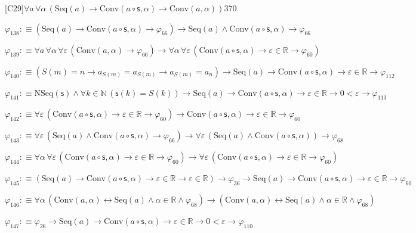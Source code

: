 \begin{fullproof}{[C29]}{$\forall a\,\forall \alpha\,(\mathrm{Seq}(a) \to \mathrm{Conv}(a \circ \mathsf{s},\alpha) \to \mathrm{Conv}(a,\alpha))$}{370}
\begin{abbrevlist}
\item $\varphi_{138} :\equiv (\mathrm{Seq}(a) \to \mathrm{Conv}(a \circ \mathsf{s},\alpha) \to \varphi_{66}) \to \mathrm{Seq}(a) \land \mathrm{Conv}(a \circ \mathsf{s},\alpha) \to \varphi_{66}$
\item $\varphi_{139} :\equiv \forall a\,\forall \alpha\,\forall \varepsilon\,(\mathrm{Conv}(a,\alpha) \to \varphi_{66}) \to \forall \alpha\,\forall \varepsilon\,(\mathrm{Conv}(a \circ \mathsf{s},\alpha) \to \varepsilon \in \mathbb{R} \to \varphi_{60})$
\item $\varphi_{140} :\equiv (S(m) = n \to a_{S(m)} = a_{S(m)} \to a_{S(m)} = a_{n}) \to \mathrm{Seq}(a) \to \mathrm{Conv}(a \circ \mathsf{s},\alpha) \to \varepsilon \in \mathbb{R} \to \varphi_{112}$
\item $\varphi_{141} :\equiv \mathrm{NSeq}(\mathsf{s}) \land \forall k \in \mathbb{N}\,(\mathsf{s}(k) = S(k)) \to \mathrm{Seq}(a) \to \mathrm{Conv}(a \circ \mathsf{s},\alpha) \to \varepsilon \in \mathbb{R} \to 0 < \varepsilon \to \varphi_{113}$
\item $\varphi_{142} :\equiv \forall \varepsilon\,(\mathrm{Conv}(a \circ \mathsf{s},\alpha) \to \varepsilon \in \mathbb{R} \to \varphi_{60}) \to \mathrm{Conv}(a \circ \mathsf{s},\alpha) \to \varepsilon \in \mathbb{R} \to \varphi_{60}$
\item $\varphi_{143} :\equiv \forall \varepsilon\,(\mathrm{Seq}(a) \land \mathrm{Conv}(a \circ \mathsf{s},\alpha) \to \varphi_{66}) \to \forall \varepsilon\,(\mathrm{Seq}(a) \land \mathrm{Conv}(a \circ \mathsf{s},\alpha)) \to \varphi_{68}$
\item $\varphi_{144} :\equiv \forall \alpha\,\forall \varepsilon\,(\mathrm{Conv}(a \circ \mathsf{s},\alpha) \to \varepsilon \in \mathbb{R} \to \varphi_{60}) \to \forall \varepsilon\,(\mathrm{Conv}(a \circ \mathsf{s},\alpha) \to \varepsilon \in \mathbb{R} \to \varphi_{60})$
\item $\varphi_{145} :\equiv (\mathrm{Seq}(a) \to \mathrm{Conv}(a \circ \mathsf{s},\alpha) \to \varepsilon \in \mathbb{R} \to \varepsilon \in \mathbb{R}) \to \varphi_{36} \to \mathrm{Seq}(a) \to \mathrm{Conv}(a \circ \mathsf{s},\alpha) \to \varepsilon \in \mathbb{R} \to \varphi_{60}$
\item $\varphi_{146} :\equiv \forall \alpha\,(\mathrm{Conv}(a,\alpha) \leftrightarrow \mathrm{Seq}(a) \land \alpha \in \mathbb{R} \land \varphi_{68}) \to (\mathrm{Conv}(a,\alpha) \leftrightarrow \mathrm{Seq}(a) \land \alpha \in \mathbb{R} \land \varphi_{68})$
\item $\varphi_{147} :\equiv \varphi_{26} \to \mathrm{Seq}(a) \to \mathrm{Conv}(a \circ \mathsf{s},\alpha) \to \varepsilon \in \mathbb{R} \to 0 < \varepsilon \to \varphi_{110}$

\end{abbrevlist}
\end{fullproof}
